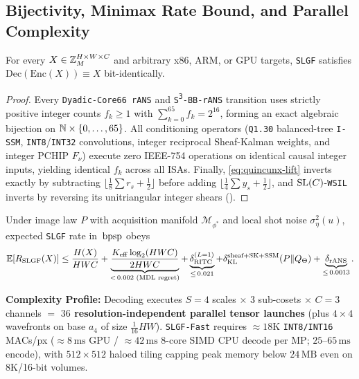 \subsection{Bijectivity, Minimax Rate Bound, and Parallel Complexity}

\begin{theorem}
\label{thm:bijectivity}
For every $X \in \mathbb{Z}_M^{H\times W\times C}$ and arbitrary x86, ARM, or GPU targets, \texttt{SLGF} satisfies $\mathrm{Dec}(\mathrm{Enc}(X)) \equiv X$ bit-identically.
\end{theorem}
\begin{proof}
Every \texttt{Dyadic-Core66 rANS} and \texttt{S\textsuperscript{3}-BB-rANS} transition uses strictly positive integer counts $f_k \ge 1$ with $\sum_{k=0}^{65} f_k = 2^{16}$, forming an exact algebraic bijection on $\mathbb{N} \times \{0,\dots,65\}$. All conditioning operators (\texttt{Q1.30} balanced-tree \texttt{I-SSM}, \texttt{INT8}/\texttt{INT32} convolutions, integer reciprocal Sheaf-Kalman weights, and integer PCHIP $F_\nu$) execute zero IEEE-754 operations on identical causal integer inputs, yielding identical $f_k$ across all ISAs. Finally, \eqref{eq:quincunx-lift} inverts exactly by subtracting $\lfloor \frac{1}{8}\sum r_s + \frac{1}{2}\rfloor$ before adding $\lfloor \frac{1}{4}\sum y_s + \frac{1}{2}\rfloor$, and $\mathrm{SL}(C)$-\texttt{WSIL} inverts by reversing its unitriangular integer shears ().
\end{proof}

\begin{theorem}
\label{thm:rate-bound}
Under image law $P$ with acquisition manifold $\mathcal{M}_{\phi^*}$ and local shot noise $\sigma_\eta^2(u)$, expected \texttt{SLGF} rate in $\,\mathrm{bpsp}$ obeys
\begin{equation}
  \mathbb{E}[R_{\mathrm{SLGF}}(X)] \le \frac{H(X)}{HWC} + \underbrace{\frac{K_{\mathrm{eff}}\log_2(HWC)}{2HWC}}_{<\,0.002\text{ (MDL regret)}} + \underbrace{\delta_{\mathrm{RITC}}^{(L=1)}}_{\le\,0.021} + \delta_{\mathrm{KL}}^{\mathrm{sheaf+SK+SSM}}(P \| Q_\Theta) + \underbrace{\delta_{\mathrm{rANS}}}_{\le\,0.0013}.
\end{equation}
\end{theorem}

\noindent\textbf{Complexity Profile:} Decoding executes $S=4$ scales $\times$ $3$ sub-cosets $\times$ $C=3$ channels $=$ \textbf{$36$ resolution-independent parallel tensor launches} (plus $4\times 4$ wavefronts on base $a_4$ of size $\frac{1}{16}HW$). \texttt{SLGF-Fast} requires $\approx 18\text{K}$ \texttt{INT8/INT16} MACs/px ($\approx 8\,\mathrm{ms}$ GPU / $\approx 42\,\mathrm{ms}$ 8-core SIMD CPU decode per MP; $25\text{--}65\,\mathrm{ms}$ encode), with $512\times 512$ haloed tiling capping peak memory below $24\,\mathrm{MB}$ even on 8K/16-bit volumes.

